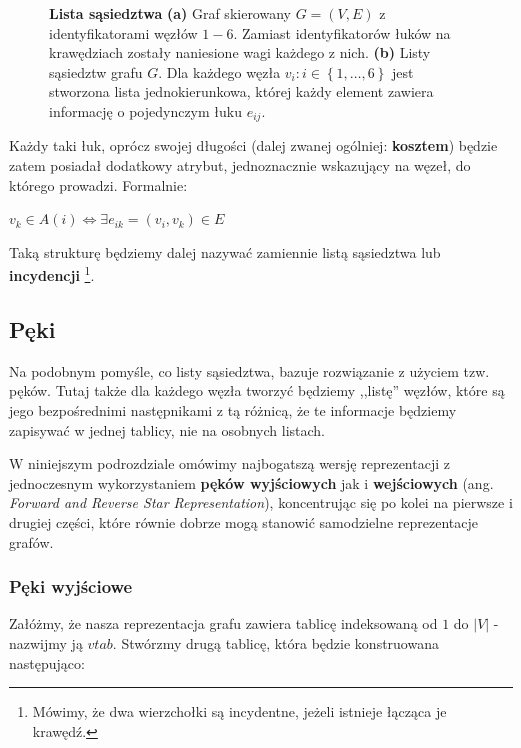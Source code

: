 \begin{figure}[!htbp]
\begin{subfigure}[b]{0.33\textwidth}
		\caption{}
	\end{subfigure}
	\caption{\textbf{Lista sąsiedztwa} \textbf{(a)} Graf skierowany $G = \left( V, E \right)$ z identyfikatorami węzłów $1-6$. Zamiast identyfikatorów łuków na krawędziach zostały naniesione wagi każdego z nich. \textbf{(b)} Listy sąsiedztw grafu $G$. Dla każdego węzła $v_{i} : i \in \left\{ 1, \ldots, 6 \right\}$ jest stworzona lista jednokierunkowa, której każdy element zawiera informację o pojedynczym łuku $e_{ij}$.}\label{fig:adjacencyList}
\end{figure}

Każdy taki łuk, oprócz swojej długości (dalej zwanej ogólniej: \textbf{kosztem}) będzie zatem posiadał dodatkowy atrybut, jednoznacznie wskazujący na węzeł, do którego prowadzi. Formalnie:

$v_{k} \in A \left ( i \right ) \Leftrightarrow \exists e_{ik} = \left( v_{i}, v_{k} \right) \in E $

Taką strukturę będziemy dalej nazywać zamiennie listą sąsiedztwa lub \textbf{incydencji} \footnote{Mówimy, że dwa wierzchołki są incydentne, jeżeli istnieje łącząca je krawędź.}.

\subsection{Pęki}

Na podobnym pomyśle, co listy sąsiedztwa, bazuje rozwiązanie z użyciem tzw. pęków. Tutaj także dla każdego węzła tworzyć będziemy ,,listę'' węzłów, które są jego bezpośrednimi następnikami z tą różnicą, że te informacje będziemy zapisywać w jednej tablicy, nie na osobnych listach.

W niniejszym podrozdziale omówimy najbogatszą wersję reprezentacji z jednoczesnym wykorzystaniem \textbf{pęków wyjściowych} jak i \textbf{ wejściowych} (ang. \textit{Forward and Reverse Star Representation}), koncentrując się po kolei na pierwsze i drugiej części, które równie dobrze mogą stanowić samodzielne reprezentacje grafów.

\subsubsection{Pęki wyjściowe}

Załóżmy, że nasza reprezentacja grafu zawiera tablicę indeksowaną od $1$ do $ \left| V \right| $ - nazwijmy ją $vtab$. Stwórzmy drugą tablicę, która będzie konstruowana następująco:

